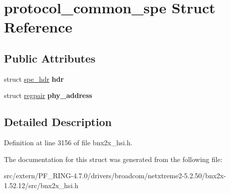 \hypertarget{structprotocol__common__spe}{
\section{protocol\_\-common\_\-spe Struct Reference}
\label{structprotocol__common__spe}
}
\subsection*{Public Attributes}
\begin{DoxyCompactItemize}
\item 
\hypertarget{structprotocol__common__spe_a2dadd9e4dd8f7f997bb3c689e6b2bf69}{
struct \hyperlink{structspe__hdr}{spe\_\-hdr} {\bfseries hdr}}
\label{structprotocol__common__spe_a2dadd9e4dd8f7f997bb3c689e6b2bf69}

\item 
\hypertarget{structprotocol__common__spe_a17405c0379f9210914de5881e2190de8}{
struct \hyperlink{structregpair}{regpair} {\bfseries phy\_\-address}}
\label{structprotocol__common__spe_a17405c0379f9210914de5881e2190de8}

\end{DoxyCompactItemize}


\subsection{Detailed Description}


Definition at line 3156 of file bnx2x\_\-hsi.h.



The documentation for this struct was generated from the following file:\begin{DoxyCompactItemize}
\item 
src/extern/PF\_\-RING-\/4.7.0/drivers/broadcom/netxtreme2-\/5.2.50/bnx2x-\/1.52.12/src/bnx2x\_\-hsi.h\end{DoxyCompactItemize}
